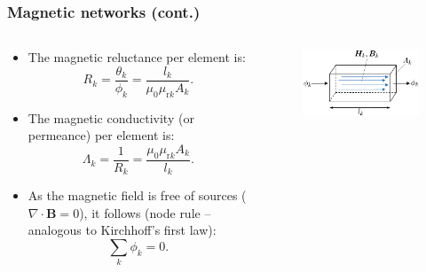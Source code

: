 \begin{frame}
	\frametitle{Magnetic networks (cont.)}
	\begin{columns}
		\begin{column}{0.575\textwidth}
			\begin{itemize}
                \item The magnetic reluctance per element is:
                \begin{equation}
                    R_k = \frac{\theta_k}{\phi_k} = \frac{l_k}{\mu_0\mu_{\mathrm{r}k}A_k}.
                \end{equation}
                \item<2-> The magnetic conductivity (or permeance) per element is:
                \begin{equation}
                    \Lambda_k = \frac{1}{R_k} = \frac{\mu_0\mu_{\mathrm{r}k}A_k}{l_k}.
                \end{equation}
                \item<3-> As the magnetic field is free of sources ($\nabla \cdot \bm{B}=0$), it follows (node rule -- analogous to Kirchhoff's first law):
                \begin{equation}
                    \sum_k \phi_k = 0.
                \end{equation}
            \end{itemize}
		\end{column}
        \hfill
		\begin{column}{0.425\textwidth}
			\begin{figure}
				\centering
				\includegraphics[height=0.4\textheight]{fig/lec02/Reluctance_element.pdf}
            \end{figure}
		\end{column}
		\end{columns}
\end{frame}

